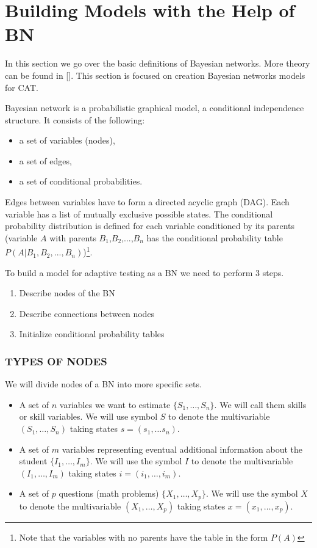 \section{Building Models with the Help of BN}

In this section we go over the basic definitions of Bayesian networks. More theory can be found in []. This section is focused on creation Bayesian networks models for CAT.

Bayesian network is a probabilistic graphical model, a conditional independence structure. It consists of the following: 
\begin{itemize}
	\item a set of variables (nodes),
	\item a set of edges,
	\item a set of conditional probabilities.
\end{itemize}
Edges between variables have to form a directed acyclic graph (DAG). Each variable has a list of mutually exclusive possible states. The conditional probability distribution is defined for each variable conditioned by its parents (variable $A$ with parents $B_1$,$B_2$,...,$B_n$ has the conditional probability table ${P(A|B_1,B_2,...,B_n)}$)\footnote{Note that the variables with no parents have the table in the form $P(A)$}. 

To build a model for adaptive testing as a BN we need to perform 3 steps.
\begin{enumerate}
	\item Describe nodes of the BN
	\item Describe connections between nodes
	\item Initialize conditional probability tables
\end{enumerate}
 
\subsubsection{TYPES OF NODES}
We will divide nodes of a BN into more specific sets. 
\begin{itemize} 
\item A set of $n$ variables we want to estimate $\{S_1,\ldots,S_n\}$. 
We will call them skills or skill variables. We will use symbol $S$ to denote the multivariable $(S_1,\ldots,S_n)$ taking states $s = (s_1,\ldots s_n)$. 
\item A set of $m$ variables representing eventual additional information about the student $\{I_1,\ldots,I_m\}$.  
We will use the symbol $I$ to denote the multivariable $(I_1,\ldots,I_m)$ taking states $i = (i_1,\ldots,i_m)$.
\item A set of $p$ questions (math problems) $\{X_1,\ldots,X_p\}$.  
We will use the symbol $X$ to denote the multivariable $(X_1,\ldots,X_p)$ taking states $x = (x_1,\ldots,x_p)$.
\end{itemize}

